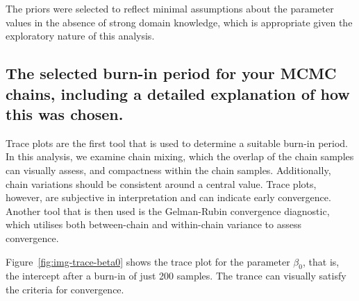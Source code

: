 \documentclass[]{article}
\begin{document}
The priors were selected to reflect minimal assumptions about the parameter values in the absence of strong domain knowledge, which is appropriate given the exploratory nature of this analysis.

\subsection{The selected burn-in period for your MCMC chains, including a detailed explanation
of how this was chosen.}


Trace plots are the first tool that is used to determine a suitable burn-in period. In this analysis, we examine chain mixing, which the overlap of the chain samples can visually assess, and compactness within the chain samples. Additionally, chain variations should be consistent around a central value. Trace plots, however, are subjective in interpretation and can indicate early convergence. Another tool that is then used is the Gelman-Rubin convergence diagnostic, which utilises both between-chain and within-chain variance to assess convergence.

Figure~\ref{fig:img-trace-beta0} shows the trace plot for the parameter $\beta_0$, that is, the intercept after a burn-in of just 200 samples. The trance can visually satisfy the criteria for convergence.
\end{document}
